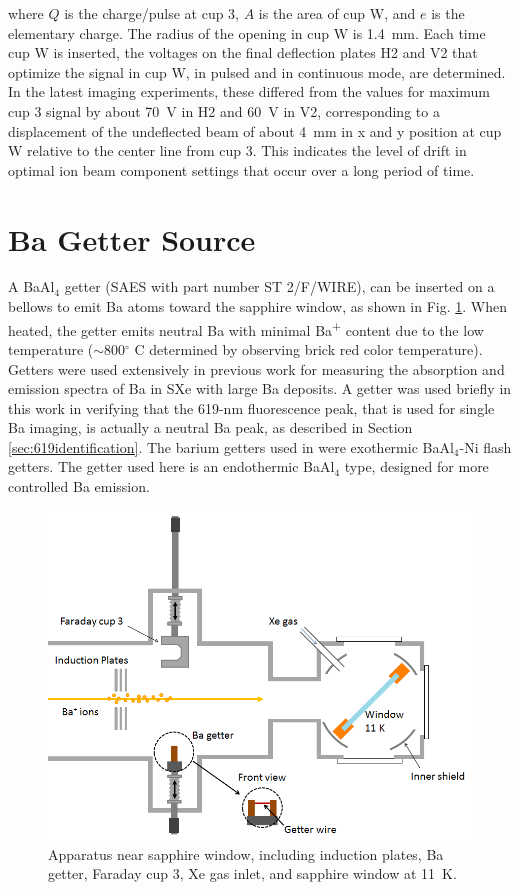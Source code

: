 \noindent
where $Q$ is the charge/pulse at cup 3, $A$ is the area of cup W, and $e$ is the elementary charge.  The radius of the opening in cup W is 1.4~mm.  Each time cup W is inserted, the voltages on the final deflection plates H2 and V2 that optimize the signal in cup W, in pulsed and in continuous mode, are determined.  In the latest imaging experiments, these differed from the values for maximum cup 3 signal by about 70~V in H2 and 60~V in V2, corresponding to a displacement of the undeflected beam of about 4~mm in x and y position at cup W relative to the center line from cup 3.  This indicates the level of drift in optimal ion beam component settings that occur over a long period of time.

\section{Ba Getter Source}
\label{sec:getter}

A BaAl$_{4}$ getter (SAES with part number ST 2/F/WIRE), can be inserted on a bellows to emit Ba atoms toward the sapphire window, as shown in Fig. \ref{fig:endOfBeamBa}.  When heated, the getter emits neutral Ba with minimal Ba\textsuperscript{+} content due to the low temperature ($\sim$800$^{\circ}$ C determined by observing brick red color temperature).  Getters were used extensively in previous work \cite{Brian} for measuring the absorption and emission spectra of Ba in SXe with large Ba deposits.  A getter was used briefly in this work in verifying that the 619-nm fluorescence peak, that is used for single Ba imaging, is actually a neutral Ba peak, as described in Section \ref{sec:619identification}.  The barium getters used in \cite{Brian} were exothermic BaAl$_{4}$-Ni flash getters.  The getter used here is an endothermic BaAl$_{4}$ type, designed for more controlled Ba emission.  


\begin{figure} %
        \centering
                \includegraphics[width=.75\textwidth]{figures/window_etc_justBa_frontViewGetter.png}
                \caption{Apparatus near sapphire window, including induction plates, Ba getter, Faraday cup 3, Xe gas inlet, and sapphire window at 11~K.}
\label{fig:endOfBeamBa}
\end{figure}

